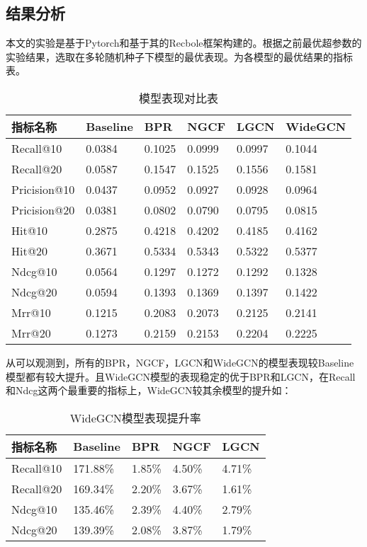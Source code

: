 \documentclass[lang=cn,11pt,a4paper,cite=authoryear]{elegantpaper}
\begin{document}
\subsection{结果分析}
本文的实验是基于Pytorch和基于其的Recbole\cite{zhao_recbole_2021}框架构建的。根据之前最优超参数的实验结果，选取在多轮随机种子下模型的最优表现。为各模型的最优结果的指标表。
  \begin{table}[!htb]
    \centering
    \caption{模型表现对比表}
      \huge
      \begin{tabular}{C{2cm}|C{1.5cm}|C{1.5cm}|C{1.5cm}|C{1.5cm}|C{1.5cm}}
      \hline
      \textbf{指标名称} & \textbf{Baseline} & \textbf{BPR} & \textbf{NGCF} & \textbf{LGCN} & \textbf{WideGCN} \\
      \hline
      Recall@10 & 0.0384 & 0.1025 & 0.0999 & 0.0997 & 0.1044\\
      Recall@20 & 0.0587 & 0.1547 & 0.1525 & 0.1556 & 0.1581\\
      Pricision@10 & 0.0437 & 0.0952 & 0.0927 & 0.0928 & 0.0964\\
      Pricision@20 & 0.0381 & 0.0802 & 0.0790 & 0.0795 & 0.0815\\
      Hit@10 & 0.2875 & 0.4218 & 0.4202 & 0.4185 & 0.4162 \\
      Hit@20 & 0.3671 & 0.5334 & 0.5343 & 0.5322 & 0.5377 \\
      Ndcg@10 & 0.0564 & 0.1297 & 0.1272 & 0.1292 & 0.1328 \\
      Ndcg@20 & 0.0594 & 0.1393 & 0.1369 & 0.1397 & 0.1422 \\
      Mrr@10 & 0.1215 & 0.2083 & 0.2073 & 0.2125 & 0.2141 \\
      Mrr@20 & 0.1273 & 0.2159 & 0.2153 & 0.2204 & 0.2225 \\
      \hline
      \end{tabular}
    \label{模型实验指标结果}
  \end{table}

  从可以观测到，所有的BPR，NGCF，LGCN和WideGCN的模型表现较Baseline模型都有较大提升。且WideGCN模型的表现稳定的优于BPR和LGCN，在Recall和Ndcg这两个最重要的指标上，WideGCN较其余模型的提升如：
  \begin{table}[!htb]
    \centering
    \caption{WideGCN模型表现提升率}
      \huge
      \begin{tabular}{C{2cm}|C{1.5cm}|C{1.5cm}|C{1.5cm}|C{1.5cm}}
      \hline
      \textbf{指标名称} & \textbf{Baseline} & \textbf{BPR} & \textbf{NGCF} & \textbf{LGCN} \\
      \hline
      Recall@10 & 171.88\% & 1.85\% & 4.50\% & 4.71\% \\
      Recall@20 & 169.34\% & 2.20\% & 3.67\% & 1.61\% \\
      Ndcg@10 & 135.46\% & 2.39\% & 4.40\% & 2.79\% \\
      Ndcg@20 & 139.39\% & 2.08\% & 3.87\% & 1.79\% \\
      \hline
      \end{tabular}
    \label{WGCN提升表}
  \end{table}
\end{document}
